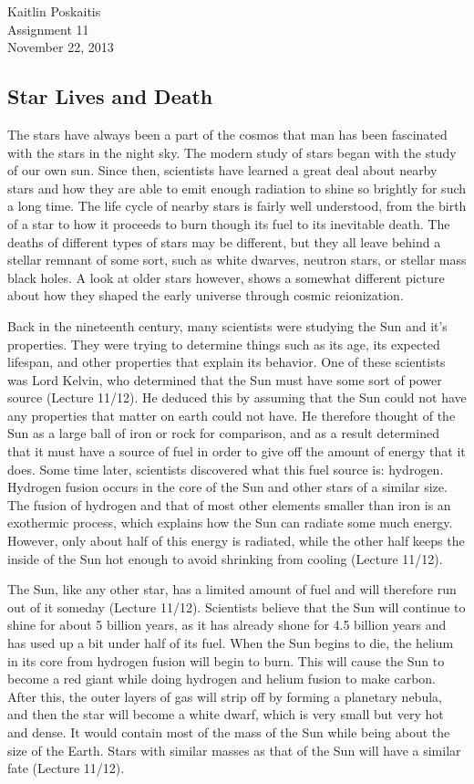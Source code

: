 \documentclass[12pt]{article}
\begin{document}
\noindent Kaitlin Poskaitis\\
Assignment 11\\
November 22, 2013
\begin{center}
    \section*{\bf Star Lives and Death}
\end{center}

The stars have always been a part of the cosmos that man has been fascinated
with the stars in the night sky.  The modern study of stars began with the study
of our own sun.  Since then, scientists have learned a great deal about nearby
stars and how they are able to emit enough radiation to shine so brightly for
such a long time.  The life cycle of nearby stars is fairly well understood,
from the birth of a star to how it proceeds to burn though its fuel to its
inevitable death.  The deaths of different types of stars may be different, but
they all leave behind a stellar remnant of some sort, such as white dwarves,
neutron stars, or stellar mass black holes.  A look at older stars however,
shows a somewhat different picture about how they shaped the early universe
through cosmic reionization.

Back in the nineteenth century, many scientists were studying the Sun and it's
properties.  They were trying to determine things such as its age, its expected
lifespan, and other properties that explain its behavior.  One of these
scientists was Lord Kelvin, who determined that the Sun must have some sort of
power source (Lecture 11/12).  He deduced this by assuming that the Sun could not
have any
properties that matter on earth could not have.  He therefore thought of the Sun
as a large ball of iron or rock for comparison, and as a result determined that
it must have a source of fuel in order to give off the amount of energy that it
does.  Some time later, scientists discovered what this fuel source is:
hydrogen. Hydrogen fusion occurs in the core of the Sun and other stars of a
similar size. The fusion of hydrogen and that of most other elements smaller
than iron is an exothermic process, which explains how the Sun can radiate some
much energy.  However, only about half of this energy is radiated, while the
other half keeps the inside of the Sun hot enough to avoid shrinking from
cooling (Lecture 11/12).

The Sun, like any other star, has a limited amount of fuel and will therefore
run out of it someday (Lecture 11/12).  Scientists believe that the Sun will
continue to shine
for about 5 billion years, as it has already shone for 4.5 billion years and has
used up a bit under half of its fuel.  When the Sun begins to die, the helium in
its core from hydrogen fusion will begin to burn.  This will cause the Sun to
become a red giant while doing hydrogen and helium fusion to make carbon.  After
this, the outer layers of gas will strip off by forming a planetary nebula, and
then the star will become a white dwarf, which is very small but very hot and
dense. It would contain most of the mass of the Sun while being about the size
of the Earth.  Stars with similar masses as that of the Sun will have a similar
fate (Lecture 11/12).
\end{document}
